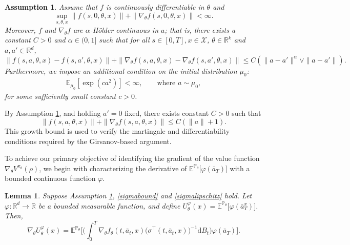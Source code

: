 \documentclass{article}
\newtheorem{lem}[thm]{Lemma}
\newtheorem{asmp}{Assumption}[section]
\newcommand{\1}{\mathbbm{1}}
\numberwithin{equation}{section}
\def\to{\rightarrow}
\def\d{{\mathrm{d}}}
\def\sE{{\mathbb{E}}}
\def\sP{\mathbb{P}}
\def\sR{{\mathbb R}}
\begin{document}
\medskip




\begin{asmp}\label{assum_light:f_theta}
    Assume that $f$ is continuously differentiable in $\theta$ and 
    $$
    \sup_{s,\theta,x}\|f(s,0,\theta,x)\|+\|\nabla_\theta f(s,0,\theta,x)\|<\infty.
    $$
    Moreover, $f$ and $\nabla_{\theta} f$ are $\alpha$-H\"older continuous in $a$; that is, there exists a constant $C>0$  and $\alpha\in (0, 1]$ such that for all  $s\in[0,T],x\in\mathcal{X}$, $\theta\in\sR^k$ and $a,a'\in \sR^d$,  
    $$
    \|f(s,a,\theta,x)-f(s,a',\theta,x)\|+\|\nabla_\theta f(s,a,\theta,x)-\nabla_\theta f(s,a',\theta,x)\|\leq C\left(\|a-a'\|^{\alpha}\vee \|a-a'\|\right).
    $$
    Furthermore, we impose an additional condition on the initial distribution $\mu_0$:
    \begin{align}\label{initial}
    \mathbb{E}_{\mu_0}\left[\exp\left(ca^2\right)\right] < \infty,
    \qquad \text{where } a \sim \mu_0,
    \end{align}
for some sufficiently small constant $c>0$.
\end{asmp} 


By Assumption \ref{assum_light:f_theta}, and holding $a'=0$ fixed, there exists constant $C>0$ such that
$$\|f(s, a, \theta, x)\| + \|\nabla_{\theta} f(s, a, \theta, x)\|\leq C(\|a\|+1).$$
{This growth bound is used to
verify the martingale and differentiability conditions required by the
Girsanov-based argument.}

\medskip

To achieve our primary objective of identifying the gradient of the value function $\nabla_\theta V^{\pi_\theta}(\rho)$, we begin with characterizing the derivative of 
$\sE^{\sP_{\theta}}\big[\varphi(\bar a_T)\big]$  with  a  bounded continuous  function $\varphi$.
\begin{lem}\label{lem:grad:fix}
Suppose Assumption \ref{assum_light:f_theta}, \eqref{sigmabound} and \eqref{sigmalipschitz} hold. Let $\varphi:\sR^d\to \sR$ be a bounded measurable  function, and define $U^\varphi_\theta(x)=\sE^{\sP_\theta}\big[\varphi(\bar a_T^x)\big]$. Then, 
$$
    \nabla_\theta U^\varphi_\theta(x)=\sE^{\sP_\theta}\bigg[\bigg(\int_0^T{\nabla_\theta f_\theta(t,\bar a_t,x)}\big(\sigma^\top(t,\bar a_t,x)\big)^{-1}\d B_t\bigg)\varphi(\bar a_T)\bigg].
    $$

 
\end{lem}
\end{document}
